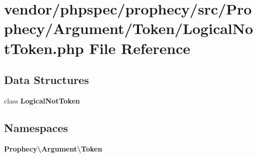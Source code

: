 \section{vendor/phpspec/prophecy/src/\+Prophecy/\+Argument/\+Token/\+Logical\+Not\+Token.php File Reference}
\label{_logical_not_token_8php}
\subsection*{Data Structures}
\begin{DoxyCompactItemize}
\item 
class {\bf Logical\+Not\+Token}
\end{DoxyCompactItemize}
\subsection*{Namespaces}
\begin{DoxyCompactItemize}
\item 
 {\bf Prophecy\textbackslash{}\+Argument\textbackslash{}\+Token}
\end{DoxyCompactItemize}
